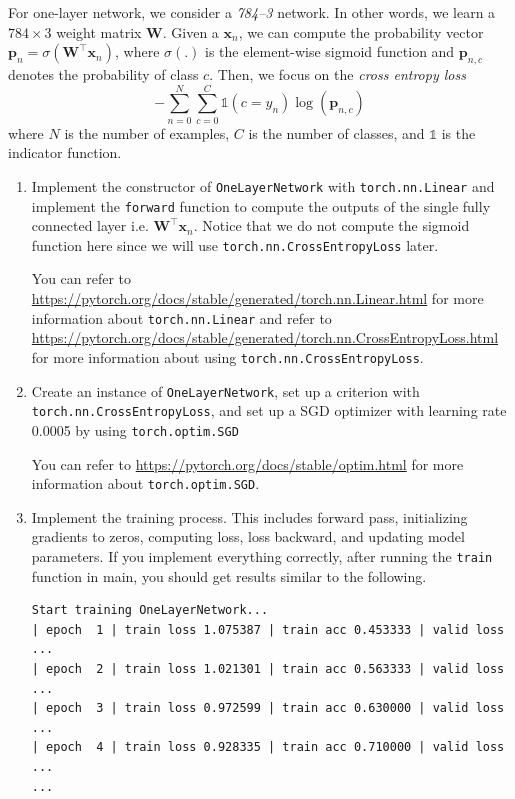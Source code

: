 \documentclass[11pt]{article}
\begin{document}
For one-layer network, we consider a \emph{784--3} network. In other words, we learn a $784 \times 3$ weight matrix $\mathbf{W}$. Given a $\mathbf{x}_n$, we can compute the probability vector $\mathbf{p}_n = \sigma(\mathbf{W}^\top \mathbf{x}_n)$, where $\sigma(.)$ is the element-wise sigmoid function and $\mathbf{p}_{n,c}$ denotes the probability of class $c$. Then, we focus on the \emph{cross entropy loss}
\[ -\sum\limits_{n=0}^{N} \sum\limits_{c=0}^{C}  \mathds{1}(c=y_n) \log (\mathbf{p}_{n, c})\]
where $N$ is the number of examples, $C$ is the number of classes, and $\mathds{1}$ is the indicator function.


\begin{enumerate}[resume]
\item Implement the constructor of \verb|OneLayerNetwork| with \verb|torch.nn.Linear| and implement the \verb|forward| function to compute the outputs of the single fully connected layer i.e. $\mathbf{W}^\top \mathbf{x}_n$. Notice that we do not compute the sigmoid function here since we will use \verb|torch.nn.CrossEntropyLoss| later. 

You can refer to \url{https://pytorch.org/docs/stable/generated/torch.nn.Linear.html} for more information about \verb|torch.nn.Linear| and refer to \url{https://pytorch.org/docs/stable/generated/torch.nn.CrossEntropyLoss.html} for more information about using \verb|torch.nn.CrossEntropyLoss|.

\solution{}

\item Create an instance of \verb|OneLayerNetwork|, set up a criterion with \verb|torch.nn.CrossEntropyLoss|, and set up a SGD optimizer with learning rate 0.0005 by using \verb|torch.optim.SGD| 

\solution{}

You can refer to \url{https://pytorch.org/docs/stable/optim.html} for more information about \verb|torch.optim.SGD|.

\item Implement the training process. This includes forward pass, initializing gradients to zeros, computing loss, loss backward, and updating model parameters. If you implement everything correctly, after running the \verb|train| function in main, you should get results similar to the following. 

\begin{verbatim}
Start training OneLayerNetwork...
| epoch  1 | train loss 1.075387 | train acc 0.453333 | valid loss ...
| epoch  2 | train loss 1.021301 | train acc 0.563333 | valid loss ...
| epoch  3 | train loss 0.972599 | train acc 0.630000 | valid loss ...
| epoch  4 | train loss 0.928335 | train acc 0.710000 | valid loss ...
...
\end{verbatim}

\solution{}

\end{enumerate}
\end{document}
